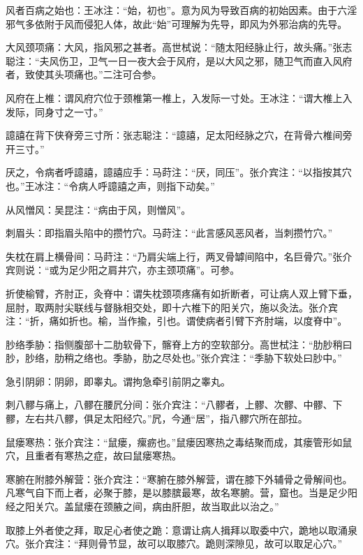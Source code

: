 \documentclass[12pt]{ctexbook}%
\begin{document}
\begin{jiaozhu}
  \item 风者百病之始也：王冰注：“始，初也”。意为风为导致百病的初始因素。由于六淫邪气多依附于风而侵犯人体，故此“始”可理解为先导，即风为外邪治病的先导。
  \item 大风颈项痛：大风，指风邪之甚者。高世栻说：“随太阳经脉止行，故头痛。”张志聪注：“夫风伤卫，卫气一日一夜大会于风府，是以大风之邪，随卫气而直入风府者，致使其头项痛也。”二注可合参。
  \item 风府在上椎：谓风府穴位于颈椎第一椎上，入发际一寸处。王冰注：“谓大椎上入发际，同身寸之一寸。”
  \item 譩譆在背下侠脊旁三寸所：张志聪注：“譩譆，足太阳经脉之穴，在背骨六椎间旁开三寸。”
  \item 厌之，令病者呼譩譆，譩譆应手：马莳注：“厌，同压”。张介宾注：“以指按其穴也。”王冰注：“令病人呼譩譆之声，则指下动矣。”
  \item 从风憎风：吴昆注：“病由于风，则憎风”。
  \item 刺眉头：即指眉头陷中的攒竹穴。马莳注：“此言感风恶风者，当刺攒竹穴。”
  \item 失枕在肩上横骨间：马莳注：“乃肩尖端上行，两叉骨罅间陷中，名巨骨穴。”张介宾则说：“或为足少阳之肩井穴，亦主颈项痛”。可参。
  \item 折使榆臂，齐肘正，灸脊中：谓失枕颈项疼痛有如折断者，可让病人双上臂下垂，屈肘，取两肘尖联线与督脉相交处，即十六椎下的阳关穴，施以灸法。张介宾注：“折，痛如折也。榆，当作揄，引也。谓使病者引臂下齐肘端，以度脊中”。
  \item 䏚络季胁：指侧腹部十二肋软骨下，髂脊上方的空软部分。高世栻注：“肋䏚稍曰䏚，䏚络，肋稍之络也。季胁，肋之尽处也。”张介宾注：“季胁下软处曰䏚中。”
  \item 急引阴卵：阴卵，即睾丸。谓拘急牵引前阴之睾丸。
  \item 刺八髎与痛上，八髎在腰凥分间：张介宾注：“八髎者，上髎、次髎、中髎、下髎，左右共八髎，俱足太阳经穴。”凥，今通“居”，指八髎穴所在部拉。
  \item 鼠瘘寒热：张介宾注：“鼠瘘，瘰疬也。”鼠瘘因寒热之毒结聚而成，其瘘管形如鼠穴，且重者有寒热之症，故曰鼠瘘寒热。
  \item 寒腑在附膝外解营：张介宾注：“寒腑在膝外解营，谓在膝下外辅骨之骨解间也。凡寒气自下而上者，必聚于膝，是以膝膑最寒，故名寒腑。营，窟也。当是足少阳经之阳关穴。盖鼠瘘在颈腋之间，病由肝胆，故当取此以治之。”
  \item 取膝上外者使之拜，取足心者使之跪：意谓让病人揖拜以取委中穴，跪地以取涌泉穴。张介宾注：“拜则骨节显，故可以取膝穴。跪则深隙见，故可以取足心穴。”
\end{jiaozhu}
\end{document}
